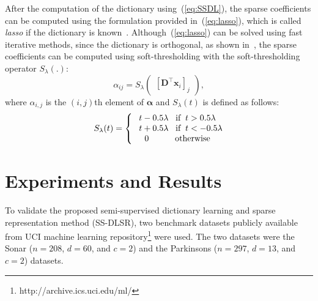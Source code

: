 \documentclass{llncs}
\begin{document}
After the computation of the dictionary using~(\ref{eq:SSDL}), the sparse coefficients can be computed using the formulation provided in~(\ref{eq:lasso}), which is called \emph{lasso} if the dictionary is known~\cite{DL:Tibshirani96}. Although~(\ref{eq:lasso}) can be solved using fast iterative methods, since the dictionary is orthogonal, as shown in~\cite{DL:Donoho95,DL:Friedman07}, the sparse coefficients can be computed using soft-thresholding with the soft-thresholding operator $S_{\lambda}(.)$:
\begin{equation}\label{eq:softThresholding}
\alpha_{ij}=S_{\lambda}\begin{pmatrix}[\mathbf{D}^{\top}\mathbf{x}_i]_j\end{pmatrix},
\end{equation}
where $\alpha_{i,j}$ is the $(i,j)$th element of $\bm{\alpha}$ and $S_{\lambda}(t)$ is defined as follows:
\begin{equation}
S_{\lambda}(t)=\left\{\begin{matrix}
t-0.5\lambda\;\;\; \textup{if}\;\;t>0.5\lambda \\ \;\;\:t+0.5\lambda\;\;\; \textup{if}\;\;t<-0.5\lambda
\\
0 \;\;\;\;\;\;\;\;\;\;\;\textup{otherwise}
\end{matrix}\right.
\end{equation}

\section{Experiments and Results}
\label{sec:Experiment}

To validate the proposed semi-supervised dictionary learning and sparse representation method (SS-DLSR), two benchmark datasets publicly available from UCI machine learning repository\footnote[1]{http://archive.ics.uci.edu/ml/} were used. The two datasets were the Sonar ($n=208$, $d=60$, and $c=2$) and the Parkinsons ($n=297$, $d=13$, and $c=2$) datasets.
\end{document}
